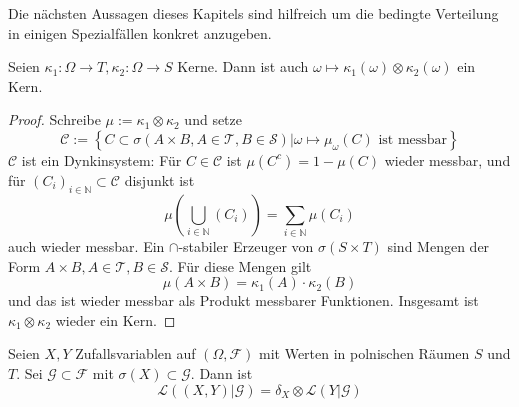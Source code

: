 Die nächsten Aussagen dieses Kapitels sind hilfreich um die bedingte Verteilung in einigen Spezialfällen konkret anzugeben.
\begin{lemma}\label{thm:kernel_prod}
Seien $\kappa_1: \Omega\rightarrow T,\kappa_2: \Omega\rightarrow S$ Kerne. Dann ist auch $\omega \mapsto \kappa_1(\omega) \otimes \kappa_2(\omega)$ ein Kern.
\end{lemma}
\begin{proof}
Schreibe $\mu:=\kappa_1\otimes\kappa_2$ und setze 
$$\mathcal{C}:=\left\{C\subset\sigma(A\times B, A\in\mathcal{T}, B\in\mathcal{S})\vert \omega \mapsto \mu_\omega(C) \text{ ist messbar}\right\}$$
$\mathcal{C}$ ist ein Dynkinsystem: Für $C\in\mathcal{C}$ ist $\mu(C^c)=1-\mu(C)$ wieder messbar, und für $(C_i)_{i\in\mathbb{N}}\subset \mathcal{C}$ disjunkt ist 
$$\mu(\bigcup_{i\in\mathbb{N}}(C_i))=\sum_{i\in\mathbb{N}}\mu(C_i)$$
auch wieder messbar. Ein $\cap$-stabiler Erzeuger von $\sigma(S\times T)$ sind Mengen der Form $A\times B, A\in \mathcal{T}, B\in\mathcal{S}$. Für diese Mengen gilt
$$\mu(A\times B) = \kappa_1(A)\cdot\kappa_2(B)$$
und das ist wieder messbar als Produkt messbarer Funktionen. Insgesamt ist $\kappa_1\otimes\kappa_2$ wieder ein Kern.
\end{proof}
\begin{lemma}\label{thm:determined_kernel}
Seien $X, Y$ Zufallsvariablen auf $(\Omega, \mathcal{F})$ mit Werten in polnischen Räumen $S$ und $T$. Sei $\mathcal{G}\subset \mathcal{F}$ mit $\sigma(X)\subset \mathcal{G}$. Dann ist 
$$\mathcal{L}\left((X,Y)\vert \mathcal{G}\right) = \delta_X \otimes \mathcal{L}(Y\vert \mathcal{G})$$
\end{lemma}
